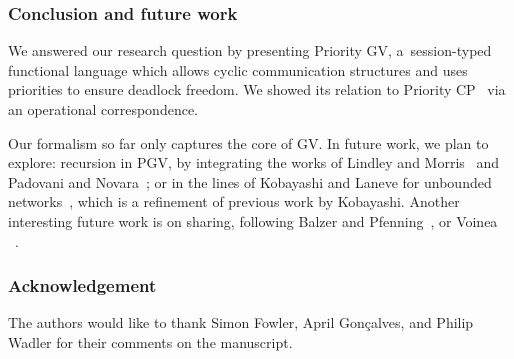 \documentclass[main.tex]{subfiles}
\begin{document}
\subsubsection*{Conclusion and future work}
We answered our research question by presenting Priority GV, a~session-typed functional language which allows cyclic communication structures and uses priorities to ensure deadlock freedom. We showed its relation to Priority CP~\cite{dardhagay18} via an operational correspondence.

Our formalism so far only captures the core of GV. In future work, we plan to explore: recursion in PGV, by integrating the works of Lindley and Morris~\cite{lindleymorris16} and Padovani and Novara~\cite{padovaninovara15}; or in the lines of Kobayashi and Laneve for unbounded networks~\cite{KL17}, which is a refinement of previous work by Kobayashi. %
Another interesting future work is on sharing, following Balzer and Pfenning~\cite{balzerpfenning17}, or Voinea \etal~\cite{VoineaDG19}.

\subsubsection*{Acknowledgement}
The authors would like to thank Simon Fowler, April Gon\c{c}alves, and Philip Wadler for their comments on the manuscript.
\end{document}
